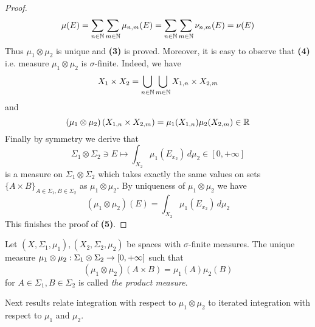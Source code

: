 \begin{proof}
$$\mu(E) = \sum_{n\in {\mathbb N}}\sum_{m\in {\mathbb N}}\mu_{n,m}(E) = \sum_{n\in {\mathbb N}}\sum_{m\in {\mathbb N}}\nu_{n,m}(E) = \nu(E)$$
Thus $\mu_1\otimes \mu_2$ is unique and \textbf{(3)} is proved. Moreover, it is easy to observe that \textbf{(4)} i.e. measure $\mu_1\otimes \mu_2$ is $\sigma$-finite. Indeed, we have
$$X_1\times X_2 = \bigcup_{n\in {\mathbb N}}\bigcup_{m\in {\mathbb N}}X_{1,n}\times X_{2,m}$$
and
$$\left(\mu_1\otimes \mu_2\right)\left(X_{1,n}\times X_{2,m}\right) = \mu_1(X_{1,n})\mu_2(X_{2,m}) \in {\mathbb R}$$
Finally by symmetry we derive that
$$\Sigma_1\otimes \Sigma_2\ni E \mapsto \int_{X_2}\mu_1(E_{x_2})\,d\mu_2\in [0,+\infty]$$
is a measure on $\Sigma_1\otimes \Sigma_2$ which takes exactly the same values on sets $\big\{A\times B\big\}_{A\in \Sigma_1,B\in \Sigma_2}$ as $\mu_1\otimes \mu_2$. By uniqueness of $\mu_1\otimes \mu_2$ we have
$$(\mu_1\otimes \mu_2)(E) = \int_{X_2}\mu_1(E_{x_2})\,d\mu_2$$
This finishes the proof of \textbf{(5)}.
\end{proof}

\begin{definition}
Let $(X,\Sigma_1,\mu_1), (X_2,\Sigma_2,\mu_2)$ be spaces with $\sigma$-finite measures. The unique measure $\mu_1\otimes \mu_2:\Sigma_1\otimes \Sigma_2\rightarrow [0,+\infty]$ such that
$$\left(\mu_1\otimes \mu_2\right)\left(A\times B\right) = \mu_1(A)\mu_2(B)$$
for $A\in \Sigma_1, B\in \Sigma_2$ is called \textit{the product measure}.
\end{definition}
\noindent
Next results relate integration with respect to $\mu_1\otimes \mu_2$ to iterated integration with respect to $\mu_1$ and $\mu_2$.


